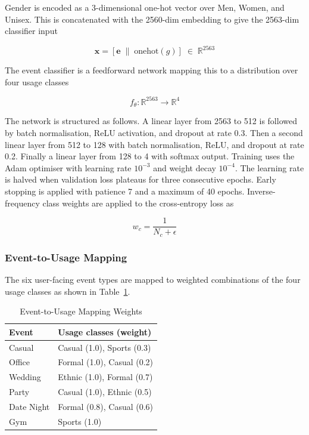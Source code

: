 \documentclass[conference]{IEEEtran}
\begin{document}
Gender is encoded as a 3-dimensional one-hot vector over Men, Women, and Unisex. This is concatenated with the 2560-dim embedding to give the 2563-dim classifier input

\begin{equation}
\mathbf{x} = [\mathbf{e} \;\|\; \text{onehot}(g)] \;\in\; \mathbb{R}^{2563}
\label{eq:input}
\end{equation}

The event classifier is a feedforward network mapping this to a distribution over four usage classes

\begin{equation}
f_\theta: \mathbb{R}^{2563} \rightarrow \mathbb{R}^{4}
\label{eq:mlp}
\end{equation}

The network is structured as follows. A linear layer from 2563 to 512 is followed by batch normalisation, ReLU activation, and dropout at rate 0.3. Then a second linear layer from 512 to 128 with batch normalisation, ReLU, and dropout at rate 0.2. Finally a linear layer from 128 to 4 with softmax output. Training uses the Adam optimiser \cite{b7} with learning rate $10^{-3}$ and weight decay $10^{-4}$. The learning rate is halved when validation loss plateaus for three consecutive epochs. Early stopping is applied with patience 7 and a maximum of 40 epochs. Inverse-frequency class weights are applied to the cross-entropy loss as

\begin{equation}
w_c = \frac{1}{N_c + \epsilon}
\label{eq:classweight}
\end{equation}

\subsubsection{Event-to-Usage Mapping}

The six user-facing event types are mapped to weighted combinations of the four usage classes as shown in Table~\ref{tab:mapping}.

\begin{table}[htbp]
\caption{Event-to-Usage Mapping Weights}
\begin{center}
\renewcommand{\arraystretch}{1.15}
\begin{tabular}{|l|l|}
\hline
\textbf{Event} & \textbf{Usage classes (weight)} \\
\hline
Casual     & Casual (1.0), Sports (0.3) \\
Office     & Formal (1.0), Casual (0.2) \\
Wedding    & Ethnic (1.0), Formal (0.7) \\
Party      & Casual (1.0), Ethnic (0.5) \\
Date Night & Formal (0.8), Casual (0.6) \\
Gym        & Sports (1.0) \\
\hline
\end{tabular}
\label{tab:mapping}
\end{center}
\end{table}
\end{document}
